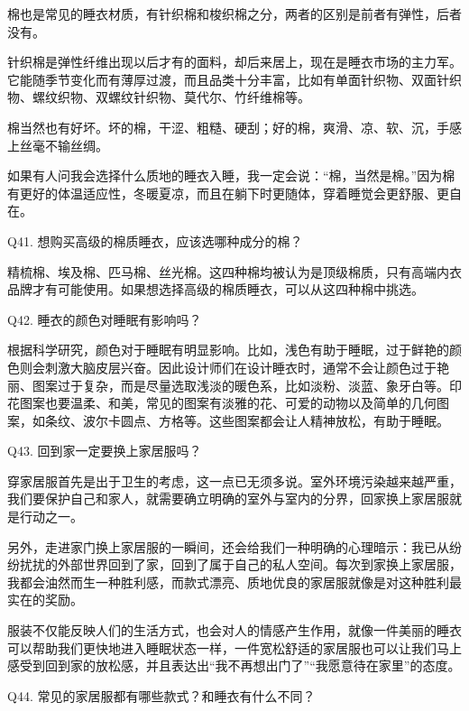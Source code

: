 \documentclass[12pt,UTF8]{ctexbook}
\begin{document}
棉也是常见的睡衣材质，有针织棉和梭织棉之分，两者的区别是前者有弹性，后者没有。

针织棉是弹性纤维出现以后才有的面料，却后来居上，现在是睡衣市场的主力军。它能随季节变化而有薄厚过渡，而且品类十分丰富，比如有单面针织物、双面针织物、螺纹织物、双螺纹针织物、莫代尔、竹纤维棉等。

棉当然也有好坏。坏的棉，干涩、粗糙、硬刮；好的棉，爽滑、凉、软、沉，手感上丝毫不输丝绸。

如果有人问我会选择什么质地的睡衣入睡，我一定会说：“棉，当然是棉。”因为棉有更好的体温适应性，冬暖夏凉，而且在躺下时更随体，穿着睡觉会更舒服、更自在。





Q41. 想购买高级的棉质睡衣，应该选哪种成分的棉？


精梳棉、埃及棉、匹马棉、丝光棉。这四种棉均被认为是顶级棉质，只有高端内衣品牌才有可能使用。如果想选择高级的棉质睡衣，可以从这四种棉中挑选。





Q42. 睡衣的颜色对睡眠有影响吗？


根据科学研究，颜色对于睡眠有明显影响。比如，浅色有助于睡眠，过于鲜艳的颜色则会刺激大脑皮层兴奋。因此设计师们在设计睡衣时，通常不会让颜色过于艳丽、图案过于复杂，而是尽量选取浅淡的暖色系，比如淡粉、淡蓝、象牙白等。印花图案也要温柔、和美，常见的图案有淡雅的花、可爱的动物以及简单的几何图案，如条纹、波尔卡圆点、方格等。这些图案都会让人精神放松，有助于睡眠。





Q43. 回到家一定要换上家居服吗？


穿家居服首先是出于卫生的考虑，这一点已无须多说。室外环境污染越来越严重，我们要保护自己和家人，就需要确立明确的室外与室内的分界，回家换上家居服就是行动之一。

另外，走进家门换上家居服的一瞬间，还会给我们一种明确的心理暗示：我已从纷纷扰扰的外部世界回到了家，回到了属于自己的私人空间。每次到家换上家居服，我都会油然而生一种胜利感，而款式漂亮、质地优良的家居服就像是对这种胜利最实在的奖励。

服装不仅能反映人们的生活方式，也会对人的情感产生作用，就像一件美丽的睡衣可以帮助我们更快地进入睡眠状态一样，一件宽松舒适的家居服也可以让我们马上感受到回到家的放松感，并且表达出“我不再想出门了”“我愿意待在家里”的态度。





Q44. 常见的家居服都有哪些款式？和睡衣有什么不同？
\end{document}
